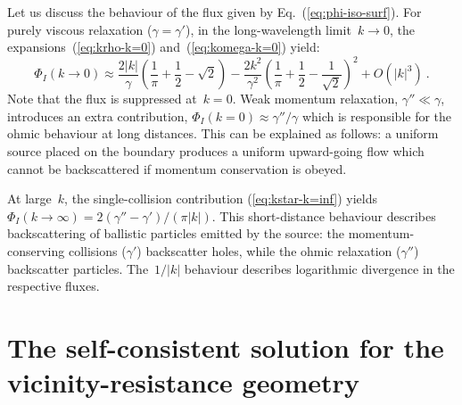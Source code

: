 \documentclass[preprint,aps,eqsecnum, prb]{revtex4-1}
\begin{document}
Let us discuss the behaviour of the flux given by Eq.~(\ref{eq:phi-iso-surf}).
For purely viscous relaxation ($\gamma = \gamma'$),
in the long-wavelength limit~$k \to 0$,
the expansions~(\ref{eq:krho-k=0}) and~(\ref{eq:komega-k=0}) yield:
\begin{equation}
  \label{eq:phi-I-low}
  \Phi_I(k\to 0) \approx \frac{2|k|}{\gamma} \left(\frac{1}{\pi} + \frac{1}{2}
    - \sqrt{2}\right)
  - \frac{2k^2}{\gamma^2}
    \left(\frac{1}{\pi} + \frac{1}{2} - \frac{1}{\sqrt{2}}\right)^2
    + O(|k|^3)
\ .
\end{equation}
Note that the flux is suppressed at~$k = 0$.
Weak momentum relaxation, $\gamma'' \ll \gamma$,
introduces an extra contribution,
$\Phi_I(k = 0) \approx \gamma'' / \gamma$ which is responsible for
the ohmic behaviour at long distances. This can be explained as follows:
a uniform source placed on the boundary produces a uniform upward-going
flow which cannot be backscattered if momentum conservation is obeyed.

At large~$k$, the single-collision contribution (\ref{eq:kstar-k=inf}) yields
$\Phi_I(k\to \infty) = 2 (\gamma'' - \gamma')/(\pi |k|)$.
This short-distance behaviour describes
backscattering of ballistic particles emitted by the source: the
momentum-conserving collisions ($\gamma'$) backscatter holes,
while the ohmic relaxation ($\gamma''$) backscatter particles.
The~$1/|k|$ behaviour describes logarithmic divergence in the
respective fluxes.

\section{The self-consistent solution for the vicinity-resistance geometry}
\label{sec:vicinity}
\end{document}
